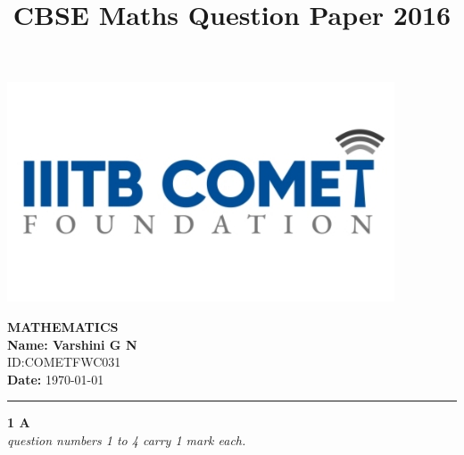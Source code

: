 \documentclass[12pt,a4paper]{article}
\begin{document}
\begin{center}
\begin{minipage}{0.2\textwidth}
    \includegraphics[width=\linewidth]{iiit_logo.png} 
\end{minipage}
\hfill
\begin{minipage}{0.75\textwidth}
    \centering
    {\Large \textbf{MATHEMATICS}}\\[1ex]
    \textbf{Name: Varshini G N} \\[0.5ex]
    ID:COMETFWC031\\
    \textbf{Date:} \today
\end{minipage}
\end{center}

\vspace{1em}
\title{CBSE Maths Question Paper 2016}
\hrule
\vspace{1em}


\begin{center}
\textbf{1 A} \\
\textit{question numbers 1 to 4 carry 1 mark each.}
\end{center}
\end{document}
